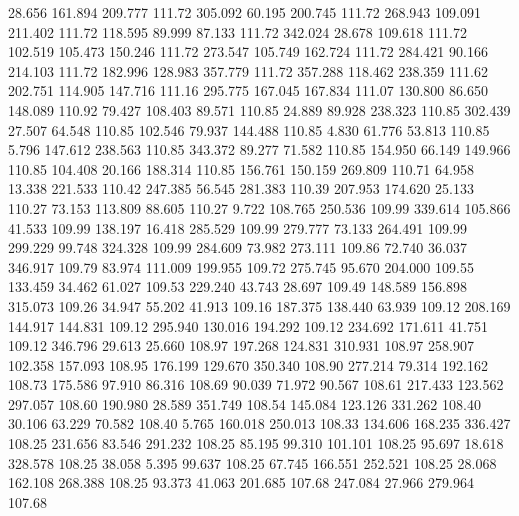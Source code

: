   28.656  161.894  209.777       111.72
 305.092   60.195  200.745       111.72
 268.943  109.091  211.402       111.72
 118.595   89.999   87.133       111.72
 342.024   28.678  109.618       111.72
 102.519  105.473  150.246       111.72
 273.547  105.749  162.724       111.72
 284.421   90.166  214.103       111.72
 182.996  128.983  357.779       111.72
 357.288  118.462  238.359       111.62
 202.751  114.905  147.716       111.16
 295.775  167.045  167.834       111.07
 130.800   86.650  148.089       110.92
  79.427  108.403   89.571       110.85
  24.889   89.928  238.323       110.85
 302.439   27.507   64.548       110.85
 102.546   79.937  144.488       110.85
   4.830   61.776   53.813       110.85
   5.796  147.612  238.563       110.85
 343.372   89.277   71.582       110.85
 154.950   66.149  149.966       110.85
 104.408   20.166  188.314       110.85
 156.761  150.159  269.809       110.71
  64.958   13.338  221.533       110.42
 247.385   56.545  281.383       110.39
 207.953  174.620   25.133       110.27
  73.153  113.809   88.605       110.27
   9.722  108.765  250.536       109.99
 339.614  105.866   41.533       109.99
 138.197   16.418  285.529       109.99
 279.777   73.133  264.491       109.99
 299.229   99.748  324.328       109.99
 284.609   73.982  273.111       109.86
  72.740   36.037  346.917       109.79
  83.974  111.009  199.955       109.72
 275.745   95.670  204.000       109.55
 133.459   34.462   61.027       109.53
 229.240   43.743   28.697       109.49
 148.589  156.898  315.073       109.26
  34.947   55.202   41.913       109.16
 187.375  138.440   63.939       109.12
 208.169  144.917  144.831       109.12
 295.940  130.016  194.292       109.12
 234.692  171.611   41.751       109.12
 346.796   29.613   25.660       108.97
 197.268  124.831  310.931       108.97
 258.907  102.358  157.093       108.95
 176.199  129.670  350.340       108.90
 277.214   79.314  192.162       108.73
 175.586   97.910   86.316       108.69
  90.039   71.972   90.567       108.61
 217.433  123.562  297.057       108.60
 190.980   28.589  351.749       108.54
 145.084  123.126  331.262       108.40
  30.106   63.229   70.582       108.40
   5.765  160.018  250.013       108.33
 134.606  168.235  336.427       108.25
 231.656   83.546  291.232       108.25
  85.195   99.310  101.101       108.25
  95.697   18.618  328.578       108.25
  38.058    5.395   99.637       108.25
  67.745  166.551  252.521       108.25
  28.068  162.108  268.388       108.25
  93.373   41.063  201.685       107.68
 247.084   27.966  279.964       107.68
